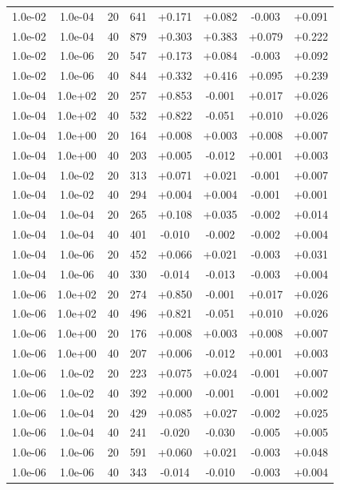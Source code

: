 \documentclass[11pt,a4paper]{article}
\begin{document}
\begin{table}
\begin{tabular}{*{8}c}
 1.0e-02 	 & 1.0e-04 	 & 20 & 641 	 & +0.171 & +0.082 & -0.003 & +0.091 \\ 
 1.0e-02 	 & 1.0e-04 	 & 40 & 879 	 & +0.303 & +0.383 & +0.079 & +0.222 \\ 
 1.0e-02 	 & 1.0e-06 	 & 20 & 547 	 & +0.173 & +0.084 & -0.003 & +0.092 \\
 1.0e-02 	 & 1.0e-06 	 & 40 & 844 	 & +0.332 & +0.416 & +0.095 & +0.239 \\ 
 \hline 
 1.0e-04 	 & 1.0e+02 	 & 20 & 257 	 & +0.853 & -0.001 & +0.017 & +0.026 \\ 
 1.0e-04 	 & 1.0e+02 	 & 40 & 532 	 & +0.822 & -0.051 & +0.010 & +0.026 \\ 
 1.0e-04 	 & 1.0e+00 	 & 20 & 164 	 & +0.008 & +0.003 & +0.008 & +0.007 \\ 
 1.0e-04 	 & 1.0e+00 	 & 40 & 203 	 & +0.005 & -0.012 & +0.001 & +0.003 \\  
 1.0e-04 	 & 1.0e-02 	 & 20 & 313 	 & +0.071 & +0.021 & -0.001 & +0.007 \\ 
 1.0e-04 	 & 1.0e-02 	 & 40 & 294 	 & +0.004 & +0.004 & -0.001 & +0.001 \\ 
 1.0e-04 	 & 1.0e-04 	 & 20 & 265 	 & +0.108 & +0.035 & -0.002 & +0.014 \\
 1.0e-04 	 & 1.0e-04 	 & 40 & 401 	 & -0.010 & -0.002 & -0.002 & +0.004 \\ 
 1.0e-04 	 & 1.0e-06 	 & 20 & 452 	 & +0.066 & +0.021 & -0.003 & +0.031 \\ 
 1.0e-04 	 & 1.0e-06 	 & 40 & 330 	 & -0.014 & -0.013 & -0.003 & +0.004 \\ 
 \hline
 1.0e-06 	 & 1.0e+02 	 & 20 & 274 	 & +0.850 & -0.001 & +0.017 & +0.026 \\ 
 1.0e-06 	 & 1.0e+02 	 & 40 & 496 	 & +0.821 & -0.051 & +0.010 & +0.026 \\
 1.0e-06 	 & 1.0e+00 	 & 20 & 176 	 & +0.008 & +0.003 & +0.008 & +0.007 \\ 
 1.0e-06 	 & 1.0e+00 	 & 40 & 207 	 & +0.006 & -0.012 & +0.001 & +0.003 \\ 
 1.0e-06 	 & 1.0e-02 	 & 20 & 223 	 & +0.075 & +0.024 & -0.001 & +0.007 \\ 
 1.0e-06 	 & 1.0e-02 	 & 40 & 392 	 & +0.000 & -0.001 & -0.001 & +0.002 \\ 
 1.0e-06 	 & 1.0e-04 	 & 20 & 429 	 & +0.085 & +0.027 & -0.002 & +0.025 \\ 
 1.0e-06 	 & 1.0e-04 	 & 40 & 241 	 & -0.020 & -0.030 & -0.005 & +0.005 \\ 
 1.0e-06 	 & 1.0e-06 	 & 20 & 591 	 & +0.060 & +0.021 & -0.003 & +0.048 \\ 
 1.0e-06 	 & 1.0e-06 	 & 40 & 343 	 & -0.014 & -0.010 & -0.003 & +0.004 \\ 

\end{tabular}
\label{TAB::timesteps}
\end{table} 
\end{document}
